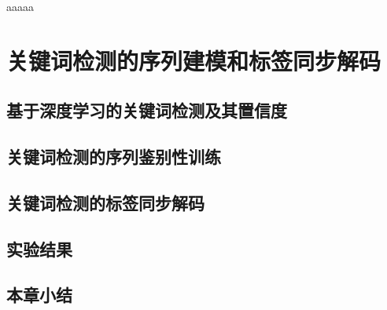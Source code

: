 \documentclass[doctor, nofonts, openright, twoside, cs4size, submit]{sjtuthesis}
\begin{document}

\maketitle

\makeenglishtitle

\makeatletter
\ifsjtu@submit\relax
	
	aaaaa
	\cleardoublepage
	
	\cleardoublepage
\else
	\makeDeclareOriginal
	\makeDeclareAuthorization
\fi
\makeatother


\frontmatter 	%

\pagestyle{main}


\tableofcontents
\listoffigures
{} %
\listoftables
{}  %


\mainmatter	%

\pagestyle{main}









\chapter{关键词检测的序列建模和标签同步解码}
\label{chap:kws}
\section{基于深度学习的关键词检测及其置信度}
\label{chap:kws-intro}
\section{关键词检测的序列鉴别性训练}
\label{chap:kws-dt}
\section{关键词检测的标签同步解码}
\label{chap:kws-lsd}
\section{实验结果}
\label{chap:kws-exp}
\section{本章小结}
\label{chap:kws-sum}

\end{document}
